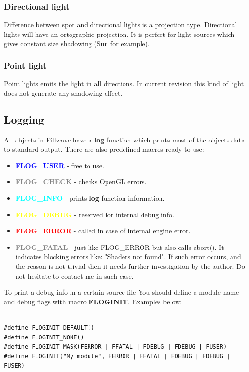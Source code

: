\documentclass{article}
\begin{document}
\subsubsection{Directional light}\label{sec:Directional light}
\indent \indent Difference between spot and directional lights is a projection type. Directional lights will have an ortographic projection. It is perfect for light sources which gives constant size shadowing (Sun for example).

\subsubsection{Point light}\label{sec:Point light}
\indent \indent Point lights emits the light in all directions. In current revision this kind of light does not generate any shadowing effect.

\subsection{Logging}\label{sec:Logging}
\indent \indent All objects in Fillwave have a \textbf{log} function which prints most of the objects data to standard output. There are also predefined macros ready to use:

\begin{itemize}
\item \textbf{\textcolor{blue}{FLOG\_USER}} - free to use.
\item \textbf{\textcolor{gray}{FLOG\_CHECK}} - checks OpenGL errors.
\item \textbf{\textcolor{cyan}{FLOG\_INFO}} - prints \textbf{log} function information.
\item \textbf{\textcolor{yellow}{FLOG\_DEBUG}} - reserved for internal debug info.
\item \textbf{\textcolor{red}{FLOG\_ERROR}} - called in case of internal engine error.
\item \textbf{\textcolor{gray}{FLOG\_FATAL}} - just like FLOG\_ERROR but also calls abort(). It indicates blocking errors like: "Shaders not found". If such error occurs, and the reason is not trivial then it needs further investigation by the author. Do not hesitate to contact me in such case.
\end{itemize}
\indent To print a debug info in a certain source file You should define a module name and debug flags with macro \textbf{FLOGINIT}. Examples below:
\begin{lstlisting}

#define FLOGINIT_DEFAULT()
#define FLOGINIT_NONE()
#define FLOGINIT_MASK(FERROR | FFATAL | FDEBUG | FDEBUG | FUSER)
#define FLOGINIT("My module", FERROR | FFATAL | FDEBUG | FDEBUG | FUSER)


\end{lstlisting}
\end{document}
